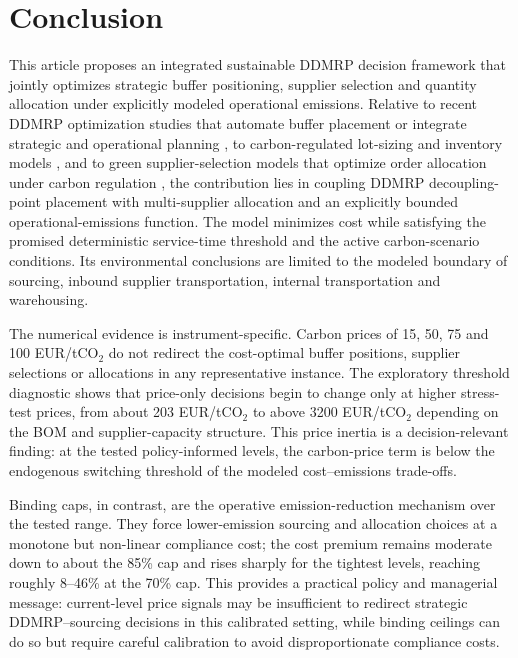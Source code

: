 \documentclass[preprint,12pt,authoryear]{elsarticle}
\begin{document}


\section{Conclusion} \label{vrptwsynexact:sec:end}
This article proposes an integrated sustainable DDMRP decision framework that jointly optimizes strategic buffer positioning, supplier selection and quantity allocation under explicitly modeled operational emissions. Relative to recent DDMRP optimization studies that automate buffer placement or integrate strategic and operational planning \citep{martin2023,younespour2024,habbadi2025,krajcovic2024}, to carbon-regulated lot-sizing and inventory models \citep{he2015,toptal2014,chowdhury2020}, and to green supplier-selection models that optimize order allocation under carbon regulation \citep{mirzaee2023,hamdan2023,shi2025,lamba2019cie,rosyidi2024}, the contribution lies in coupling DDMRP decoupling-point placement with multi-supplier allocation and an explicitly bounded operational-emissions function. The model minimizes cost while satisfying the promised deterministic service-time threshold and the active carbon-scenario conditions. Its environmental conclusions are limited to the modeled boundary of sourcing, inbound supplier transportation, internal transportation and warehousing.

The numerical evidence is instrument-specific. Carbon prices of 15, 50, 75 and 100 EUR/tCO$_2$ do not redirect the cost-optimal buffer positions, supplier selections or allocations in any representative instance. The exploratory threshold diagnostic shows that price-only decisions begin to change only at higher stress-test prices, from about 203 EUR/tCO$_2$ to above 3200 EUR/tCO$_2$ depending on the BOM and supplier-capacity structure. This price inertia is a decision-relevant finding: at the tested policy-informed levels, the carbon-price term is below the endogenous switching threshold of the modeled cost--emissions trade-offs.

Binding caps, in contrast, are the operative emission-reduction mechanism over the tested range. They force lower-emission sourcing and allocation choices at a monotone but non-linear compliance cost; the cost premium remains moderate down to about the 85\% cap and rises sharply for the tightest levels, reaching roughly 8--46\% at the 70\% cap. This provides a practical policy and managerial message: current-level price signals may be insufficient to redirect strategic DDMRP--sourcing decisions in this calibrated setting, while binding ceilings can do so but require careful calibration to avoid disproportionate compliance costs.
\end{document}
